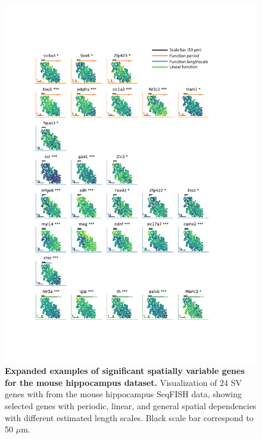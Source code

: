 \begin{figure}
    \centering
    \includegraphics[width=\textwidth]{"SuppFig6"}
    \caption[Expanded examples of significant spatially variable genes for the mouse hippocampus dataset]{\textbf{Expanded examples of significant spatially variable genes for the mouse hippocampus dataset.} Visualization of 24 SV genes with from the mouse hippocampus SeqFISH data, showing selected genes with periodic, linear, and general spatial dependencies with different estimated length scales. Black scale bar correspond to 50 \( \mu \)m.}
    \label{fig:ss6}
\end{figure}

